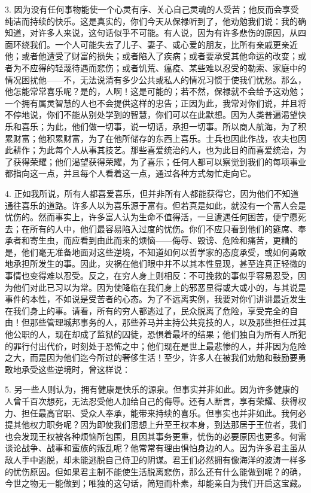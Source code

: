 3. 因为没有任何事物能使一个心灵有序、关心自己灵魂的人受苦；他反而会享受纯洁而持续的快乐。这是真实的，你们今天从保禄听到了，他劝勉我们说：我的确知道，对许多人来说，这句话似乎不可能。有人说，因为有许多悲伤的原因，从四面环绕我们。一个人可能失去了儿子、妻子、或心爱的朋友，比所有亲戚更亲近他；或者他遭受了财富的损失；或者陷入了疾病；或者要承受其他命运的改变；或者为不应得的轻蔑待遇而悲伤；或者饥荒、瘟疫、某些难以忍受的勒索、家庭中的情况困扰他——不，无法说清有多少公共或私人的情况习惯于使我们忧愁。那么，他怎能常常喜乐呢？是的，人啊！这是可能的；若不然，保禄就不会给予这劝勉；一个拥有属灵智慧的人也不会提供这样的忠告；正因为此，我常对你们说，并且将不停地说，你们不能从别处学到的智慧，你们可以在此默想。因为人类普遍渴望快乐和喜乐；为此，他们做一切事，说一切话，承担一切事。所以商人航海，为了积累财富；他积累财富，为了在他所储存的东西上喜乐。士兵也因此作战，农夫也因此耕作；为此每个人从事其技艺。那些喜爱统治的人，也为此目的而喜爱统治，为了获得荣耀；他们渴望获得荣耀，为了喜乐；任何人都可以察觉到我们的每项事业都指向这一点，并且每个人看着这一点，通过各种方式匆忙走向它。\par

4. 正如我所说，所有人都喜爱喜乐，但并非所有人都能获得它，因为他们不知道通往喜乐的道路。许多人以为喜乐源于富有。但若真是如此，就没有一个富人会是忧伤的。然而事实上，许多富人认为生命不值得活，一旦遭遇任何困苦，便宁愿死去；在所有的人中，他们最容易陷入过度的忧伤。你们不应只看到他们的筵席、奉承者和寄生虫，而应看到由此而来的烦恼——侮辱、毁谤、危险和痛苦，更糟的是，他们毫无准备地面对这些逆境，不知道如何以哲学家的态度承受，或如何勇敢地承担所发生的事。因此，灾祸在他们眼中并不以其本性显现，甚至连真正轻微的事情也变得难以忍受。反之，在穷人身上则相反：不可挽救的事似乎容易忍受，因为他们对此已习以为常。因为使降临在我们身上的邪恶显得或大或小的，与其说是事件的本性，不如说是受苦者的心态。为了不远离实例，我要对你们讲讲最近发生在我们身上的事。请看，所有的穷人都逃过了，民众脱离了危险，享受完全的自由！但那些管理城邦事务的人，那些养马并主持公共竞技的人，以及那些担任过其他公职的人，现在却成了监狱的囚徒，恐惧着最坏的结果；他们独自为所有人所犯的罪行付出代价，时刻处于恐怖之中；他们现在是世上最悲惨的人，并非因为危险之大，而是因为他们迄今所过的奢侈生活！至少，许多人在被我们劝勉和鼓励要勇敢地承受这些逆境时，曾这样说：\par

5. 另一些人则认为，拥有健康是快乐的源泉。但事实并非如此。因为许多健康的人曾千百次想死，无法忍受他人加给自己的侮辱。还有人断言，享有荣耀、获得权力、担任最高官职、受众人奉承，能带来持续的喜乐。但事实也并非如此。我何必提其他权力职务呢？因为即使我们思想上升至王权本身，到达那居于王位者，我们也会发现王权被各种烦恼所包围，且因其事务更重，忧伤的必要原因也更多。何需谈论战争、战事和蛮族的叛乱呢？他常常有理由惧怕身边的人。因为许多君主虽从敌人手中逃脱，却未能逃脱自己侍卫的阴谋。君王们必然拥有像海洋的波涛一样多的忧伤原因。但如果君主制不能使生活脱离悲伤，那么还有什么能做到呢？的确，今世之物无一能做到；唯独的这句话，简短而朴素，却能亲自为我们开启这宝藏。\par

